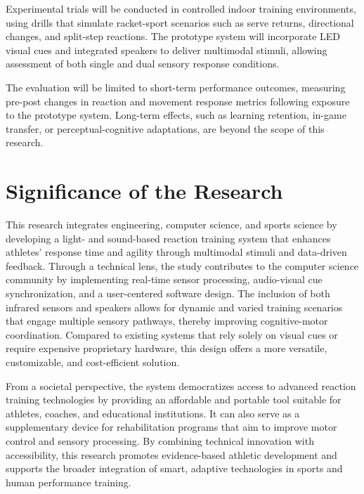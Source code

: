 Experimental trials will be conducted in controlled indoor training environments, using drills that simulate racket-sport scenarios such as serve returns, directional changes, and split-step reactions. The prototype system will incorporate LED visual cues and integrated speakers to deliver multimodal stimuli, allowing assessment of both single and dual sensory response conditions.

The evaluation will be limited to short-term performance outcomes, measuring pre-post changes in reaction and movement response metrics following exposure to the prototype system. Long-term effects, such as learning retention, in-game transfer, or perceptual-cognitive adaptations, are beyond the scope of this research.


\section{Significance of the Research}
\label{sec:significance}

This research integrates engineering, computer science, and sports science by developing a light- and sound-based reaction training system that enhances athletes’ response time and agility through multimodal stimuli and data-driven feedback. Through a technical lens, the study contributes to the computer science community by implementing real-time sensor processing, audio-visual cue synchronization, and a user-centered software design. The inclusion of both infrared sensors and speakers allows for dynamic and varied training scenarios that engage multiple sensory pathways, thereby improving cognitive-motor coordination. Compared to existing systems that rely solely on visual cues or require expensive proprietary hardware, this design offers a more versatile, customizable, and cost-efficient solution.

From a societal perspective, the system democratizes access to advanced reaction training technologies by providing an affordable and portable tool suitable for athletes, coaches, and educational institutions. It can also serve as a supplementary device for rehabilitation programs that aim to improve motor control and sensory processing. By combining technical innovation with accessibility, this research promotes evidence-based athletic development and supports the broader integration of smart, adaptive technologies in sports and human performance training.